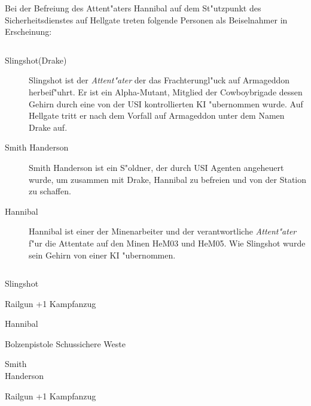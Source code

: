 
Bei der Befreiung des Attent"aters Hannibal auf dem St"utzpunkt des Sicherheitsdienstes auf Hellgate treten folgende Personen 
als Beiselnahmer in Erscheinung:

\begin{column}[l]{0.45}
    \begin{description}
        \item[Slingshot(Drake)] Slingshot ist der \emph{Attent"ater} der das Frachterungl"uck auf Armageddon herbeif"uhrt. Er ist 
            ein Alpha-Mutant, Mitglied der Cowboybrigade dessen Gehirn durch eine von der USI kontrollierten KI "ubernommen wurde. 
            Auf Hellgate tritt er nach dem Vorfall auf Armageddon unter dem Namen Drake auf.
        \item[Smith Handerson] Smith Handerson ist ein S"oldner, der durch USI Agenten angeheuert wurde, um 
            zusammen mit Drake, Hannibal zu befreien und von der Station zu schaffen.
        \item[Hannibal] Hannibal ist einer der Minenarbeiter und der verantwortliche \emph{Attent"ater} f"ur die Attentate auf den Minen 
            HeM03 und HeM05. Wie Slingshot wurde sein Gehirn von einer KI "ubernommen.
    \end{description}
\end{column}
\begin{column}[r]{0.45}
    \begin{nscsheet}[h]{Slingshot}
        \nscstats[ATT=1,AGG=2,DEX=3]
        \nscruler
        \begin{nscinventory}
            \nscitem[Waffen] Railgun +1
            \nscitem[R"ustung] Kampfanzug
        \end{nscinventory}
    \end{nscsheet}    

    \begin{nscsheet}[h]{Hannibal}
        \nscstats[ATT=1,AGG=2,DEX=3,COM=2,CON=2]
        \nscruler
        \begin{nscinventory}
            \nscitem[Waffen] Bolzenpistole
            \nscitem[R"ustung] Schussichere Weste
        \end{nscinventory}
    \end{nscsheet} 

    \begin{nscsheet}[h]{Smith\\ Handerson}
        \nscstats[ATT=3,AGG=2]
        \nscruler
        \begin{nscinventory}
            \nscitem[Waffen] Railgun +1
            \nscitem[R"ustung] Kampfanzug
        \end{nscinventory}
    \end{nscsheet}
\end{column}

\newpage